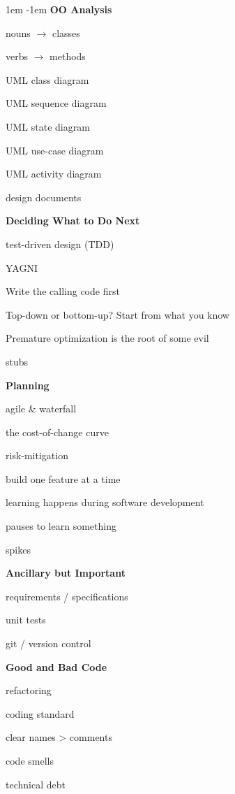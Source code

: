 \documentclass[12pt]{article}
\newenvironment{col3}
  {\begin{minipage}[t]{0.3\textwidth}
   \fontsize{10}{12}\selectfont
   \raggedright
   \leftskip 1em
   \parindent -1em}
  {\end{minipage}}
\newcommand{\hd}[1]{\vspace{\baselineskip}\textbf{#1}\vspace{0.1em}}
\begin{document}
\vspace{-0.5\baselineskip}
\begin{col3}
\hd{OO Analysis}

nouns $\rightarrow$ classes

verbs $\rightarrow$ methods

UML class diagram

UML sequence diagram

UML state diagram

UML use-case diagram

UML activity diagram

design documents

\hd{Deciding What to Do Next}

test-driven design (TDD)

YAGNI

Write the calling code first

Top-down or bottom-up? Start from what you know

Premature optimization is the root of some evil

stubs

\hd{Planning}

agile \& waterfall

the cost-of-change curve

risk-mitigation

build one feature at a time

learning happens during software development

pauses to learn something

spikes


\hd{Ancillary but Important}

requirements / specifications

unit tests

git / version control


\hd{Good and Bad Code}

refactoring

coding standard

clear names > comments

code smells

technical debt
\end{col3}
\hfill
\end{document}

